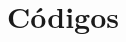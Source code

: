 \documentclass[10pt,a4paper]{article}
\begin{document}
\section{Códigos}
%
%
%
%
%
%
%
%
%
%
%
%
%
%
%
%
%
%
\end{document}
